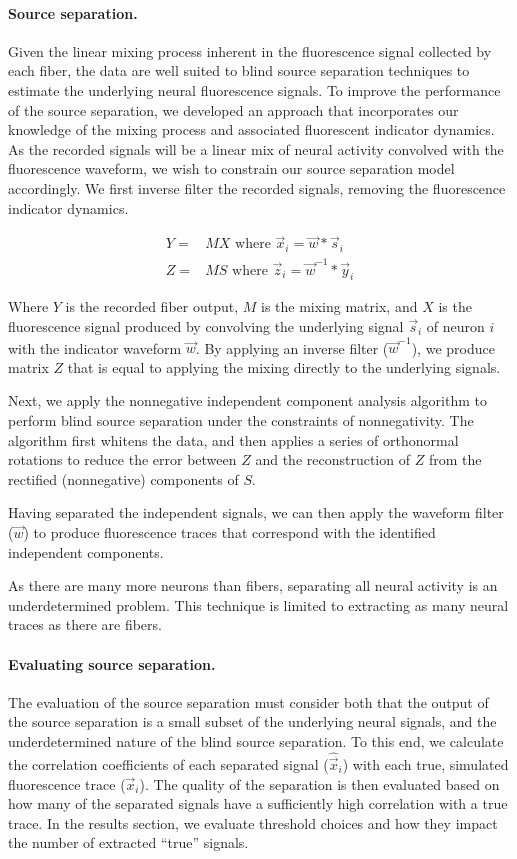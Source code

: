 \paragraph{Source separation.} Given the linear mixing process inherent in the fluorescence signal collected by each fiber, the data are well suited to blind source separation techniques to estimate the underlying neural fluorescence signals. To improve the performance of the source separation, we developed an approach that incorporates our knowledge of the mixing process and associated fluorescent indicator dynamics. As the recorded signals will be a linear mix of neural activity convolved with the fluorescence waveform, we wish to constrain our source separation model accordingly. We first inverse filter the recorded signals, removing the fluorescence indicator dynamics.

\begin{align}
Y = & M X \text{ where } \vec{x}_i = \vec{w} * \vec{s}_i \\
Z = & M S \text{ where } \vec{z}_i = \vec{w}^{-1} * \vec{y}_i
\end{align}

Where $Y$ is the recorded fiber output, $M$ is the mixing matrix, and $X$ is the fluorescence signal produced by convolving the underlying signal $\vec{s}_i$ of neuron $i$ with the indicator waveform $\vec{w}$. By applying an inverse filter ($\vec{w}^{-1}$), we produce matrix $Z$ that is equal to applying the mixing directly to the underlying signals.

Next, we apply the nonnegative independent component analysis algorithm \cite{Plumbley:2003dw} to perform blind source separation under the constraints of nonnegativity. The algorithm first whitens the data, and then applies a series of orthonormal rotations to reduce the error between $Z$ and the reconstruction of $Z$ from the rectified (nonnegative) components of $S$.

Having separated the independent signals, we can then apply the waveform filter ($\vec{w}$) to produce fluorescence traces that correspond with the identified independent components.

As there are many more neurons than fibers, separating all neural activity is an underdetermined problem. This technique is limited to extracting as many neural traces as there are fibers.

\paragraph{Evaluating source separation.} The evaluation of the source separation must consider both that the output of the source separation is a small subset of the underlying neural signals, and the underdetermined nature of the blind source separation. To this end, we calculate the correlation coefficients of each separated signal ($\hat{\vec{x}}_i$) with each true, simulated fluorescence trace ($\vec{x}_i$). The quality of the separation is then evaluated based on how many of the separated signals have a sufficiently high correlation with a true trace. In the results section, we evaluate threshold choices and how they impact the number of extracted ``true'' signals.

